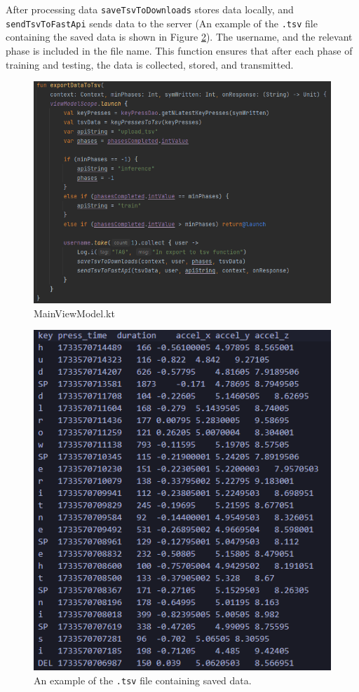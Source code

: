 After processing data \texttt{saveTsvToDownloads} stores data locally, and \texttt{sendTsvToFastApi} sends data to the server (An example of the \texttt{.tsv} file containing the saved data is shown in Figure \ref{fig:tsv_example}). The username, and the relevant phase is included in the file name. \newline
This function ensures that after each phase of training and testing, the data is collected, stored, and transmitted.

\begin{figure}[H]
	\centering
	\includegraphics[width=0.8\linewidth]{images/ExportData.png}
	\caption{MainViewModel.kt}
	\label{fig:export_data_code}
\end{figure}

\begin{figure}[H]
	\centering
	\includegraphics[width=\textwidth]{images/data_example.png}
	\caption{An example of the \texttt{.tsv} file containing saved data.}
	\label{fig:tsv_example}
\end{figure}

